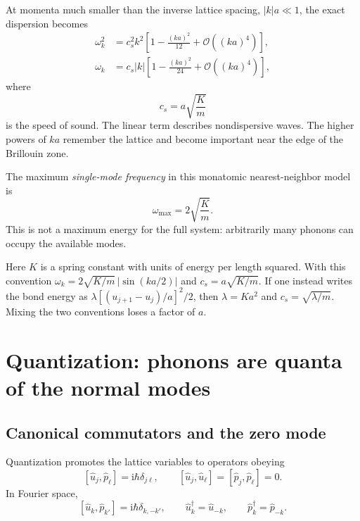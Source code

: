 \documentclass[11pt]{article}
\newcommand{\ii}{\mathrm{i}}
\newcommand{\comm}[2]{\left[#1,#2\right]}
\begin{document}
At momenta much smaller than the inverse lattice spacing,
$|k|a\ll1$, the exact dispersion becomes
\begin{align}
  \omega_k^2
  &=c_s^2k^2\left[1-\frac{(ka)^2}{12}
    +\mathcal O((ka)^4)\right],
  \label{eq:omegasqexpansion}
  \\
  \omega_k
  &=c_s|k|\left[1-\frac{(ka)^2}{24}
    +\mathcal O((ka)^4)\right],
  \label{eq:omegaexpansion}
\end{align}
where
\begin{equation}
  \boxed{c_s=a\sqrt{\frac Km}}
  \label{eq:soundspeed}
\end{equation}
is the speed of sound.  The linear term describes nondispersive waves.  The
higher powers of $ka$ remember the lattice and become important near the
edge of the Brillouin zone.

The maximum \emph{single-mode frequency} in this monatomic nearest-neighbor
model is
\begin{equation}
  \omega_{\max}=2\sqrt{\frac Km}.
  \label{eq:omegamax}
\end{equation}
This is not a maximum energy for the full system: arbitrarily many phonons
can occupy the available modes.

\begin{warningbox}
Here $K$ is a spring constant with units of energy per length squared.  With
this convention $\omega_k=2\sqrt{K/m}\,|\sin(ka/2)|$ and
$c_s=a\sqrt{K/m}$.  If one instead writes the bond energy as
$\lambda[(u_{j+1}-u_j)/a]^2/2$, then $\lambda=Ka^2$ and
$c_s=\sqrt{\lambda/m}$.  Mixing the two conventions loses a factor of $a$.
\end{warningbox}

\section{Quantization: phonons are quanta of the normal modes}

\subsection{Canonical commutators and the zero mode}

Quantization promotes the lattice variables to operators obeying
\begin{equation}
  \comm{\hat u_j}{\hat p_\ell}=\ii\hbar\delta_{j\ell},
  \qquad
  \comm{\hat u_j}{\hat u_\ell}
  =\comm{\hat p_j}{\hat p_\ell}=0.
  \label{eq:latticeCCR}
\end{equation}
In Fourier space,
\begin{equation}
  \comm{\hat u_k}{\hat p_{k'}}
  =\ii\hbar\delta_{k,-k'},
  \qquad
  \hat u_k^\dagger=\hat u_{-k},
  \qquad
  \hat p_k^\dagger=\hat p_{-k}.
  \label{eq:FourierCCR}
\end{equation}
\end{document}
